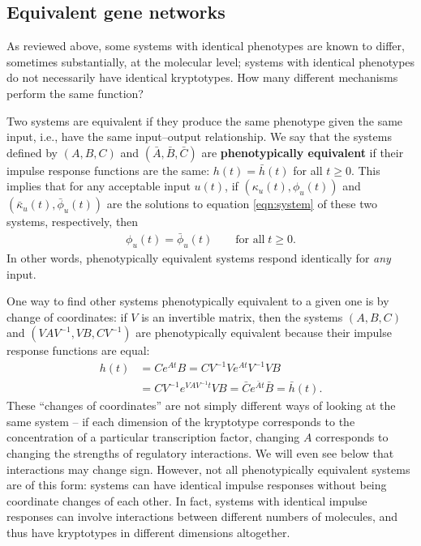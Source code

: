 \documentclass{article}
\newcommand{\1}{\mathbbm{1}}
\begin{document}
\subsection*{Equivalent gene networks}

As reviewed above,
some systems with identical phenotypes are known to differ, sometimes substantially, at the molecular level; 
systems with identical phenotypes do not necessarily have identical kryptotypes.
How many different mechanisms perform the same function? 

Two systems are equivalent if they produce the same phenotype given the same input,
i.e., have the same input--output relationship.
We say that
the systems defined by $(A,B,C)$ and $(\bar A,\bar B,\bar C)$ are
\textbf{phenotypically equivalent} 
if their impulse response functions are the same:
$h(t) = \bar h(t)$ for all $t \ge 0$.
This implies that for any acceptable input $u(t)$,
if $(\kappa_u(t),\phi_u(t))$ and $(\bar \kappa_u(t),\bar \phi_u(t))$ are the solutions to equation \eqref{eqn:system}
of these two systems, respectively, then
\begin{align*}
      \phi_u(t) = \bar \phi_u(t) \qquad \text{for all} \; t \ge 0.
\end{align*}
In other words, phenotypically equivalent systems respond identically for \emph{any} input.

One way to find other systems phenotypically equivalent to a given one
is by change of coordinates:
if $V$ is an invertible matrix, then the systems $(A,B,C)$ and $(VAV^{-1},VB,CV^{-1})$
are phenotypically equivalent because their impulse response functions are equal:
  \begin{equation}
    \begin{aligned}
      h(t) &= C e^{A t} B 
      = C V^{-1} V e^{A t} V^{-1} V B \\
      &= C V^{-1} e^{V A V^{-1} t} V B 
      = \bar{C} e^{\bar{A} t} \bar{B} = \bar h(t).
    \end{aligned}
  \end{equation}
These ``changes of coordinates'' are not simply different ways of looking at the same system --
if each dimension of the kryptotype 
corresponds to the concentration of a particular transcription factor,
changing $A$ corresponds to changing the strengths of regulatory interactions.
We will even see below that interactions may change sign. 
However, not all phenotypically equivalent systems are of this form:
systems can have identical impulse responses without being coordinate changes of each other.
In fact, systems with identical impulse responses can involve interactions between different
numbers of molecules, and thus 
have kryptotypes in
different dimensions altogether.
\end{document}
